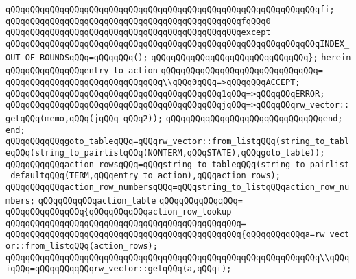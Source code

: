\verb|qQQqqQQqqQQqqQQqqQQqqQQqqQQqqQQqqQQqqQQqqQQqqQQqqQQqqQQqqQQqqQQqfi;|\newline
\newline
\verb|qQQqqQQqqQQqqQQqqQQqqQQqqQQqqQQqqQQqqQQqqQQqqQQqfqQQq0|\newline
\verb|qQQqqQQqqQQqqQQqqQQqqQQqqQQqqQQqqQQqqQQqqQQqqQQqexcept|\newline
\verb|qQQqqQQqqQQqqQQqqQQqqQQqqQQqqQQqqQQqqQQqqQQqqQQqqQQqqQQqqQQqqQQqINDEX_OUT_OF_BOUNDSqQQq=qQQqqQQq();|\newline
\verb|qQQqqQQqqQQqqQQqqQQqqQQqqQQqqQQq};|\newline
\verb|herein|\newline
\verb|qQQqqQQqqQQqqQQqentry_to_action|\newline
\verb|qQQqqQQqqQQqqQQqqQQqqQQqqQQqqQQq=|\newline
\verb|qQQqqQQqqQQqqQQqqQQqqQQqqQQqqQQq\\qQQq0qQQq=>qQQqqQQqACCEPT;|\newline
\verb|qQQqqQQqqQQqqQQqqQQqqQQqqQQqqQQqqQQqqQQqqQQq1qQQq=>qQQqqQQqERROR;|\newline
\verb|qQQqqQQqqQQqqQQqqQQqqQQqqQQqqQQqqQQqqQQqqQQqjqQQq=>qQQqqQQqrw_vector::getqQQq(memo,qQQq(jqQQq-qQQq2));|\newline
\verb|qQQqqQQqqQQqqQQqqQQqqQQqqQQqqQQqend;|\newline
\verb|end;|\newline
\newline
\verb|qQQqqQQqqQQqgoto_tableqQQq=qQQqrw_vector::from_listqQQq(string_to_tableqQQq(string_to_pairlistqQQq(NONTERM,qQQqSTATE),qQQqgoto_table));|\newline
\verb|qQQqqQQqqQQqaction_rowsqQQq=qQQqstring_to_tableqQQq(string_to_pairlist_defaultqQQq(TERM,qQQqentry_to_action),qQQqaction_rows);|\newline
\verb|qQQqqQQqqQQqaction_row_numbersqQQq=qQQqstring_to_listqQQqaction_row_numbers;|\newline
\verb|qQQqqQQqqQQqaction_table|\newline
\verb|qQQqqQQqqQQqqQQq=|\newline
\verb|qQQqqQQqqQQqqQQq{qQQqqQQqqQQqaction_row_lookup|\newline
\verb|qQQqqQQqqQQqqQQqqQQqqQQqqQQqqQQqqQQqqQQqqQQqqQQq=|\newline
\verb|qQQqqQQqqQQqqQQqqQQqqQQqqQQqqQQqqQQqqQQqqQQqqQQq{qQQqqQQqqQQqa=rw_vector::from_listqQQq(action_rows);|\newline
\newline
\verb|qQQqqQQqqQQqqQQqqQQqqQQqqQQqqQQqqQQqqQQqqQQqqQQqqQQqqQQqqQQqqQQq\\qQQqiqQQq=qQQqqQQqqQQqrw_vector::getqQQq(a,qQQqi);|\newline
